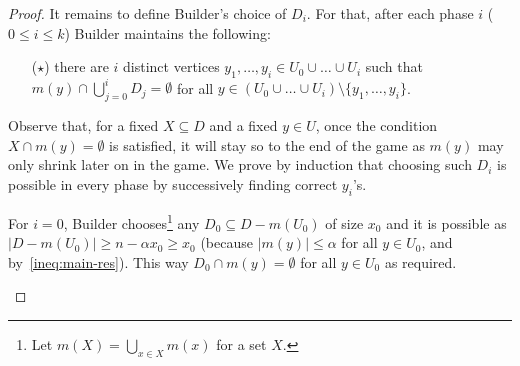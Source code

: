 \documentclass[12pt]{amsart}
\renewcommand{\leq}{\leqslant}
\renewcommand{\geq}{\geqslant}
\theoremstyle{definition}
\newcommand{\abs}[1]{\left\vert#1\right\vert}
\newcommand{\Br}{Builder\xspace}
\begin{document}
\begin{proof}
It remains to define \Br's choice of $D_i$.
For that, after each phase $i$ ($0\leq i\leq k$) \Br maintains the following:
\begin{itemize}
    \item[($\star$)] 
    there are $i$ distinct vertices $y_1,\ldots,y_i\in U_0\cup\ldots\cup U_i$ such that
    $m(y)\cap \bigcup_{j=0}^i D_j = \emptyset$ for all $y\in (U_0\cup\ldots\cup U_i)\setminus \{ y_1,\ldots,y_i\}$.
\end{itemize}
Observe that, for a fixed $X\subseteq D$ and a fixed $y\in U$,
once the condition $X\cap m(y) = \emptyset$ is satisfied, it will stay so to the end of the game
as $m(y)$ may only shrink later on in the game.
We prove by induction that choosing such $D_i$ is possible in every phase by successively finding correct $y_i$'s. 

For $i=0$, \Br chooses\footnote{Let $m(X) = \bigcup_{x\in X}m(x)$ for a set $X$.} any $D_0\subseteq D-m(U_0)$ of size $x_0$ and it is possible as 
$\abs{D-m(U_0)}\geq n-\alpha x_0\geq x_0$ (because $\abs{m(y)}\leq\alpha$ for all $y\in U_0$, and by~\eqref{ineq:main-res}).
This way $D_0\cap m(y)=\emptyset$ for all $y\in U_0$ as required.

\begin{figure}[tbh]
\begin{center}
\end{center}
\end{figure}
\end{proof}
\end{document}
